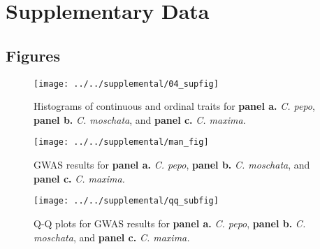 \documentclass[utf8]{frontiers_suppmat} %
\begin{document}
\onecolumn
{}

\title {{}}


\maketitle


\section{Supplementary Data}


\subsection{Figures}


\begin{figure}[h]
\begin{center}
\texttt{[image: ../../supplemental/04\_supfig]}%
\end{center}
\caption{Histograms of continuous and ordinal traits for \textbf{panel a.} \textit{C. pepo}, \textbf{panel b.} \textit{C. moschata}, and \textbf{panel c.} \textit{C. maxima.}\label{fig:1}}
\end{figure}

\clearpage

\begin{figure}[h]
	\begin{center}
		\texttt{[image: ../../supplemental/man\_fig]}%
	\end{center}
	\caption{GWAS results for \textbf{panel a.} \textit{C. pepo}, \textbf{panel b.} \textit{C. moschata}, and \textbf{panel c.} \textit{C. maxima.}\label{fig:2}}
\end{figure}

\clearpage

\begin{figure}[h]
	\begin{center}
		\texttt{[image: ../../supplemental/qq\_subfig]}%
	\end{center}
	\caption{Q-Q plots for GWAS results for \textbf{panel a.} \textit{C. pepo}, \textbf{panel b.} \textit{C. moschata}, and \textbf{panel c.} \textit{C. maxima.}\label{fig:2}}
\end{figure}
\end{document}
